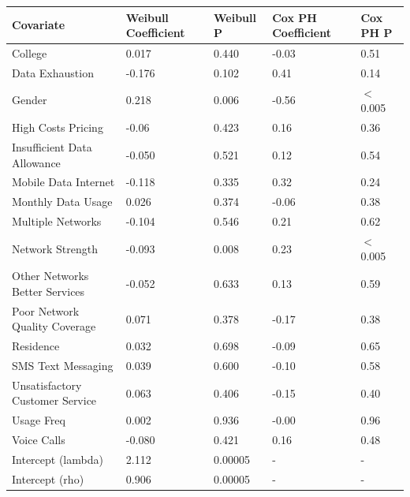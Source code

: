 \documentclass[doublespacing]{report} %
\begin{document}
\begin{table}[H]
\centering
\begin{tabular}{|l|p{2cm}|p{1.5cm}|p{2cm}|p{1.5cm}|} \hline 
\textbf{Covariate} & \textbf{Weibull Coefficient}& \textbf{Weibull P}& \textbf{Cox PH Coefficient}& \textbf{Cox PH P}\\ \hline 

College & 0.017 & 0.440 & -0.03 & 0.51 \\ \hline 
Data Exhaustion & -0.176 & 0.102 & 0.41 & 0.14 \\ \hline 
Gender & 0.218 & 0.006 & -0.56 & \(<\)0.005 \\ \hline 
High Costs Pricing & -0.06 & 0.423 & 0.16 & 0.36 \\ \hline 
Insufficient Data Allowance & -0.050 & 0.521 & 0.12 & 0.54 \\ \hline 
Mobile Data Internet & -0.118 & 0.335 & 0.32 & 0.24 \\ \hline 
Monthly Data Usage & 0.026 & 0.374 & -0.06 & 0.38 \\ \hline 
Multiple Networks & -0.104 & 0.546 & 0.21 & 0.62 \\ \hline 
Network Strength & -0.093 & 0.008 & 0.23 & \(<\)0.005 \\ \hline 
Other Networks Better Services & -0.052 & 0.633 & 0.13 & 0.59 \\ \hline 
Poor Network Quality Coverage & 0.071 & 0.378 & -0.17 & 0.38 \\ \hline 
Residence & 0.032 & 0.698 & -0.09 & 0.65 \\ \hline 
SMS Text Messaging & 0.039 & 0.600 & -0.10 & 0.58 \\ \hline 
Unsatisfactory Customer Service & 0.063 & 0.406 & -0.15 & 0.40 \\ \hline 
Usage Freq & 0.002 & 0.936 & -0.00 & 0.96 \\ \hline 
Voice Calls & -0.080 & 0.421 & 0.16 & 0.48 \\ \hline 
Intercept (lambda) & 2.112 & 0.00005 & - & - \\
Intercept (rho) & 0.906 & 0.00005 & - & - \\
\hline \hline
\end{tabular}


\end{table}
\end{document}
